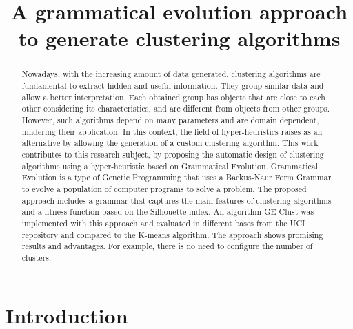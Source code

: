 \documentclass[conference,compsoc]{IEEEtran}
\begin{document}
	
\title{A grammatical evolution approach to generate clustering algorithms}


\author{
	
	
	
}

\maketitle

\begin{abstract} 
	
	Nowadays, with the increasing amount of data generated, clustering algorithms are fundamental to extract hidden and useful information. They group similar data and allow a better interpretation. Each obtained group has objects that are close to each other considering its characteristics, and are different from objects from other groups. However, such algorithms depend on many parameters and are domain dependent, hindering their application. In this context, the field of hyper-heuristics raises as an alternative by allowing the generation of a custom clustering algorithm. This work contributes to this research subject, by proposing the automatic design of clustering algorithms using a hyper-heuristic based on Grammatical Evolution. Grammatical Evolution is a type of Genetic Programming that uses a Backus-Naur Form Grammar to evolve a population of computer programs to solve a problem. The proposed approach includes a grammar that captures the main features of clustering algorithms and a fitness function based on the Silhouette index. An algorithm GE-Clust was implemented with this approach and evaluated in different bases from the UCI repository and compared to the K-means algorithm. The approach  shows promising results  and advantages. For example, there is no need to configure the number of clusters.
	
\end{abstract}


\IEEEpeerreviewmaketitle


\section{Introduction}
\end{document}
